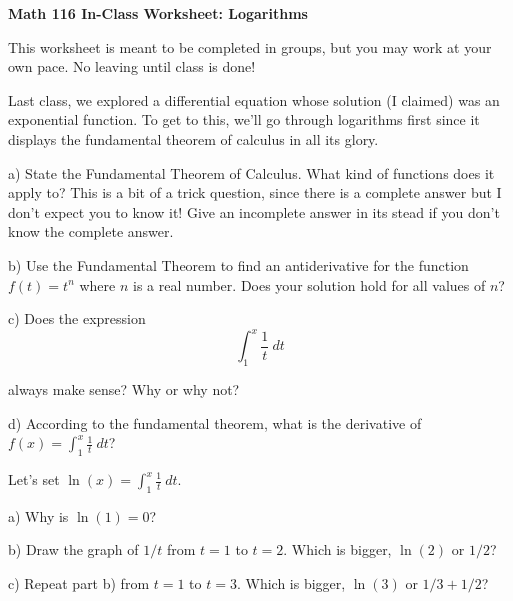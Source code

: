\documentclass[12pt]{article}
\newcommand{\numb}[1]{\noindent{\bf #1)}}
\begin{document}
\renewcommand{\headrulewidth}{0pt}

\lhead{}

\chead{}

\rhead{}

\centerline{\bf Math 116 In-Class Worksheet: Logarithms}%

\bigskip

 This worksheet is meant to be completed in groups, but you may work at your own pace. No leaving until class is done!

\bigskip

Last class, we explored a differential equation whose solution (I claimed) was an exponential function. To get to this, we'll go through logarithms first since it displays the fundamental theorem of calculus in all its glory. 

\bigskip

\numb{1} a) State the Fundamental Theorem of Calculus. What kind of functions does it apply to? This is a bit of a trick question, since there is a complete answer but I don't expect you to know it! Give an incomplete answer in its stead if you don't know the complete answer. 


\bigskip

b) Use the Fundamental Theorem to find an antiderivative for the function $f(t)=t^{n}$ where $n$ is a real number. Does your solution hold for all values of $n$?

\bigskip

\bigskip

c) Does the expression
\[
\int_1^x \frac 1 t \ dt 
\]

always make sense? Why or why not? 

\bigskip

d) According to the fundamental theorem, what is the derivative of $f(x)=\displaystyle\int^x_1 \frac 1 t \ dt$?

\newpage

\numb{2} Let's set $\ln(x)=\displaystyle\int_1^x\frac 1 t \ dt$. 

\bigskip

a) Why is $\ln(1)=0$?

\bigskip


b) Draw the graph of $1/t$ from $t=1$ to $t=2$. Which is bigger, $\ln(2)$ or $1/2$?

\bigskip

c) Repeat part b) from $t=1$ to $t=3$. Which is bigger, $\ln(3)$ or $1/3+1/2$?

\bigskip
\end{document}
